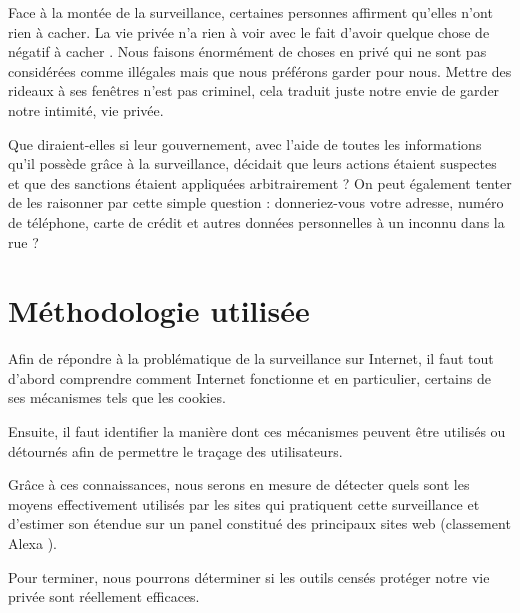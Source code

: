 Face à la montée de la surveillance, certaines personnes affirment qu'elles n'ont rien à cacher.
La vie privée n'a rien à voir avec le fait d'avoir quelque chose de négatif à cacher \cite{TED_Alessandro_Acquisti}.
Nous faisons énormément de choses en privé qui ne sont pas considérées comme illégales mais que nous préférons garder pour nous. Mettre des rideaux à ses fenêtres n'est pas criminel, cela traduit juste notre envie de garder notre intimité, vie privée.

Que diraient-elles si leur gouvernement, avec l'aide de toutes les informations qu'il possède grâce à la surveillance, décidait que leurs actions étaient suspectes et que des sanctions étaient appliquées arbitrairement ?
On peut également tenter de les raisonner par cette simple question : donneriez-vous votre adresse, numéro de téléphone, carte de crédit et autres données personnelles à un inconnu dans la rue ?

\section{Méthodologie utilisée}
Afin de répondre à la problématique de la surveillance sur Internet, il faut tout d'abord comprendre comment Internet fonctionne et en particulier, certains de ses mécanismes tels que les cookies.

Ensuite, il faut identifier la manière dont ces mécanismes peuvent être utilisés ou détournés afin de permettre le traçage des utilisateurs.

Grâce à ces connaissances, nous serons en mesure de détecter quels sont les moyens effectivement utilisés par les sites qui pratiquent cette surveillance et d'estimer son étendue sur un panel constitué des principaux sites web (classement Alexa \cite{AlexaTop}).

Pour terminer, nous pourrons déterminer si les outils censés protéger notre vie privée sont réellement efficaces. %
